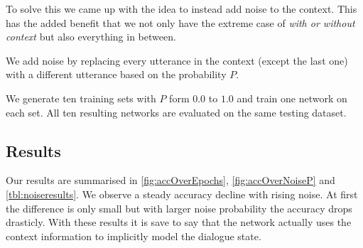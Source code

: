 \documentclass[conference]{IEEEtran}
\begin{document}
To solve this we came up with the idea to instead add noise to the context. This has the added benefit that we not only have the extreme case of \emph{with or without context} but also everything in between.

We add noise by replacing every utterance in the context (except the last one) with a different utterance based on the probability $P$. 

We generate ten training sets with $P$ form $0.0$ to $1.0$ and train one network on each set. All ten resulting networks are evaluated on the same testing dataset.

\subsection{Results}

Our results are summarised in \autoref{fig:accOverEpochs}, \autoref{fig:accOverNoiseP} and \autoref{tbl:noiseresults}. We observe a steady accuracy decline with rising noise. At first the difference is only small but with larger noise probability the accuracy drops drasticly. With these results it is save to say that the network actually uses the context information to implicitly model the dialogue state.
\end{document}
